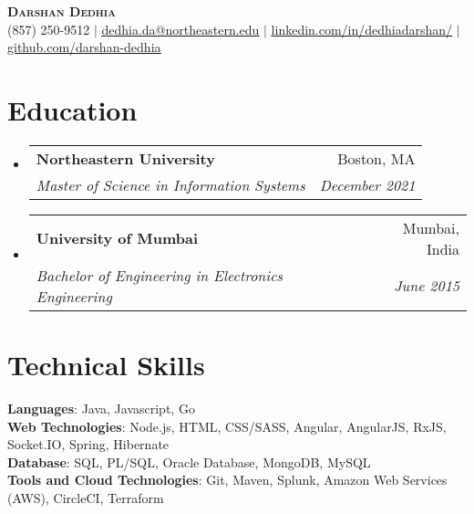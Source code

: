 \documentclass[letterpaper,11pt]{article}
\makeatletter
\newcommand{\resumeSubheading}[4]{
  \vspace{-2pt}\item
    \begin{tabular*}{0.97\textwidth}[t]{l@{\extracolsep{\fill}}r}
      \textbf{#1} & #2 \\
      \textit{\small#3} & \textit{\small #4} \\
    \end{tabular*}\vspace{-7pt}
}
\newcommand{\resumeSubHeadingListStart}{\begin{itemize}[leftmargin=0.15in, label={}]}
\newcommand{\resumeSubHeadingListEnd}{\end{itemize}}
\makeatother
\begin{document}

\begin{center}
    \textbf{\Huge \scshape Darshan Dedhia} \\ \vspace{1pt}
    \small (857) 250-9512 $|$ \href{mailto:dedhia.da@northeastern.edu}{\underline{dedhia.da@northeastern.edu}} $|$ 
    \href{https://www.linkedin.com/in/dedhiadarshan/}{\underline{linkedin.com/in/dedhiadarshan/}} $|$
    \href{https://github.com/darshan-dedhia}{\underline{github.com/darshan-dedhia}}
\end{center}


\section{Education}
  \resumeSubHeadingListStart
    \resumeSubheading
      {Northeastern University}{Boston, MA}
      {Master of Science in Information Systems}{December 2021}
    \resumeSubheading
      {University of Mumbai}{Mumbai, India}
      {Bachelor of Engineering in Electronics Engineering}{June 2015}
  \resumeSubHeadingListEnd


\section{Technical Skills}
 \begin{itemize}[leftmargin=0.15in, label={}]
    \small{\item{
     \textbf{Languages}{: Java, Javascript, Go} \\
     \textbf{Web Technologies}{: Node.js, HTML, CSS/SASS, Angular, AngularJS, RxJS, Socket.IO, Spring, Hibernate} \\
     \textbf{Database}{: SQL, PL/SQL, Oracle Database, MongoDB, MySQL} \\
     \textbf{Tools and Cloud Technologies}{: Git, Maven, Splunk, Amazon Web Services (AWS), CircleCI, Terraform} \\
    }}
 \end{itemize}
\end{document}
